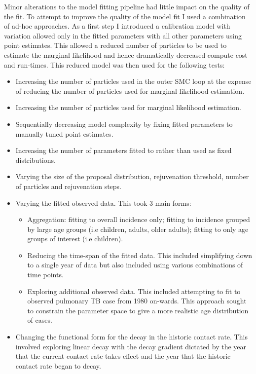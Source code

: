 \documentclass[11pt,twoside]{bristolthesis}
\providecommand{\tightlist}{%
  \setlength{\itemsep}{0pt}\setlength{\parskip}{0pt}}
\begin{document}
  Minor alterations to the model fitting pipeline had little impact on the quality of the fit. To attempt to improve the quality of the model fit I used a combination of ad-hoc approaches. As a first step I introduced a calibration model with variation allowed only in the fitted parameters with all other parameters using point estimates. This allowed a reduced number of particles to be used to estimate the marginal likelihood and hence dramatically decreased compute cost and run-times. This reduced model was then used for the following tests:
  \begin{itemize}
  \tightlist
  \item
    Increasing the number of particles used in the outer SMC loop at the expense of reducing the number of particles used for marginal likelihood estimation.
  \item
    Increasing the number of particles used for marginal likelihood estimation.
  \item
    Sequentially decreasing model complexity by fixing fitted parameters to manually tuned point estimates.
  \item
    Increasing the number of parameters fitted to rather than used as fixed distributions.
  \item
    Varying the size of the proposal distribution, rejuvenation threshold, number of particles and rejuvenation steps.
  \item
    Varying the fitted observed data. This took 3 main forms:
    \begin{itemize}
    \tightlist
    \item
      Aggregation: fitting to overall incidence only; fitting to incidence grouped by large age groups (i.e children, adults, older adults); fitting to only age groups of interest (i.e children).
    \item
      Reducing the time-span of the fitted data. This included simplifying down to a single year of data but also included using various combinations of time points.
    \item
      Exploring additional observed data. This included attempting to fit to observed pulmonary TB case from 1980 on-wards. This approach sought to constrain the parameter space to give a more realistic age distribution of cases.
    \end{itemize}
  \item
    Changing the functional form for the decay in the historic contact rate. This involved exploring linear decay with the decay gradient dictated by the year that the current contact rate takes effect and the year that the historic contact rate began to decay.

\end{itemize}
\end{document}
